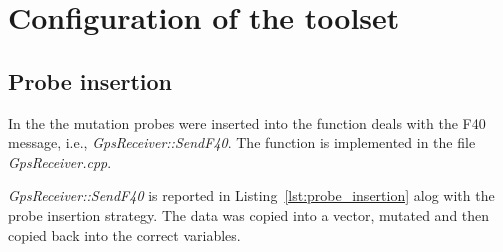 
\chapter{Configuration of the toolset}

\section{Probe insertion}

In the \case the mutation probes were inserted into the function deals with the F40 message, i.e., \emph{GpsReceiver::SendF40}. The function is implemented in the file \emph{GpsReceiver.cpp}.

\emph{GpsReceiver::SendF40} is reported in Listing~\ref{lst:probe_insertion} alog with the probe insertion strategy.
The data was copied into a vector, mutated and then copied back into the correct variables.

